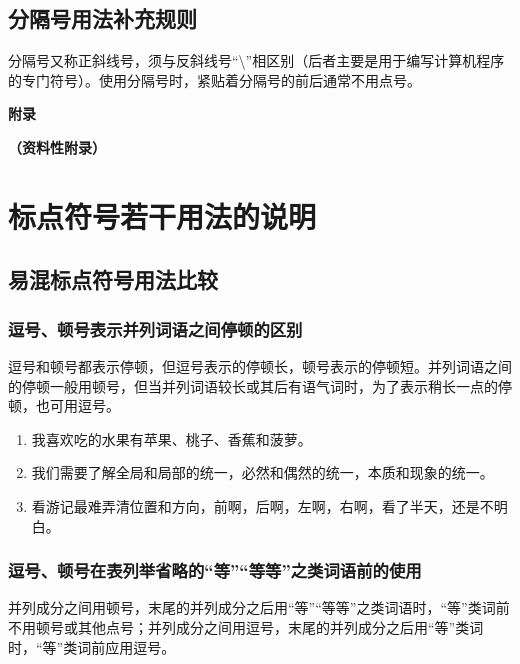 \documentclass[a4paper]{article}
\begin{document}
\subsection{分隔号用法补充规则}

分隔号又称正斜线号，须与反斜线号“\textbackslash”相区别（后者主要是用于编写计算机程序的专门符号）。使用分隔号时，紧贴着分隔号的前后通常不用点号。

\newpage

\begin{center}
    \textbf{\Large 附\hspace{1em}录}
    \vspace{0.5em}

    \textbf{\Large （资料性附录）}
\end{center}

\section{\centering 标点符号若干用法的说明}

\subsection{易混标点符号用法比较}

\subsubsection{逗号、顿号表示并列词语之间停顿的区别}

逗号和顿号都表示停顿，但逗号表示的停顿长，顿号表示的停顿短。并列词语之间的停顿一般用顿号，但当并列词语较长或其后有语气词时，为了表示稍长一点的停顿，也可用逗号。

\begin{enumerate}
    \item 我喜欢吃的水果有苹果、桃子、香蕉和菠萝。
    \item 我们需要了解全局和局部的统一，必然和偶然的统一，本质和现象的统一。
    \item 看游记最难弄清位置和方向，前啊，后啊，左啊，右啊，看了半天，还是不明白。
\end{enumerate}

\subsubsection{逗号、顿号在表列举省略的“等”“等等”之类词语前的使用}

并列成分之间用顿号，末尾的并列成分之后用“等”“等等”之类词语时，“等”类词前不用顿号或其他点号；并列成分之间用逗号，末尾的并列成分之后用“等”类词时，“等”类词前应用逗号。
\end{document}
